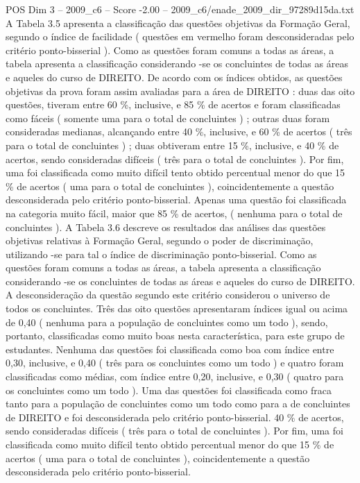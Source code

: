 \begin{textsample}{POS Dim 3 – 2009\_c6 – Score -2.00 – 2009\_c6/enade\_2009\_dir\_97289d15da.txt}
A Tabela 3.5 apresenta a classificação das questões objetivas da Formação Geral, segundo o índice de facilidade ( questões em vermelho foram desconsideradas pelo critério ponto-bisserial ).
Como as questões foram comuns a todas as áreas, a tabela apresenta a classificação considerando -se os concluintes de todas as áreas e aqueles do curso de DIREITO.
De acordo com os índices obtidos, as questões objetivas da prova foram assim avaliadas para a área de DIREITO : duas das oito questões, tiveram entre 60 \%, inclusive, e 85 \% de acertos e foram classificadas como fáceis ( somente uma para o total de concluintes ) ; outras duas foram consideradas medianas, alcançando entre 40 \%, inclusive, e 60 \% de acertos ( três para o total de concluintes ) ; duas obtiveram entre 15 \%, inclusive, e 40 \% de acertos, sendo consideradas difíceis ( três para o total de concluintes ).
Por fim, uma foi classificada como muito difícil tento obtido percentual menor do que 15 \% de acertos ( uma para o total de concluintes ), coincidentemente a questão desconsiderada pelo critério ponto-bisserial.
Apenas uma questão foi classificada na categoria muito fácil, maior que 85 \% de acertos, ( nenhuma para o total de concluintes ).
A Tabela 3.6 descreve os resultados das análises das questões objetivas relativas à Formação Geral, segundo o poder de discriminação, utilizando -se para tal o índice de discriminação ponto-bisserial.
Como as questões foram comuns a todas as áreas, a tabela apresenta a classificação considerando -se os concluintes de todas as áreas e aqueles do curso de DIREITO.
A desconsideração da questão segundo este critério considerou o universo de todos os concluintes.
Três das oito questões apresentaram índices igual ou acima de 0,40 ( nenhuma para a população de concluintes como um todo ), sendo, portanto, classificadas como muito boas nesta característica, para este grupo de estudantes.
Nenhuma das questões foi classificada como boa com índice entre 0,30, inclusive, e 0,40 ( três para os concluintes como um todo ) e quatro foram classificadas como médias, com índice entre 0,20, inclusive, e 0,30 ( quatro para os concluintes como um todo ).
Uma das questões foi classificada como fraca tanto para a população de concluintes como um todo como para a de concluintes de DIREITO e foi desconsiderada pelo critério ponto-bisserial. 40 \% de acertos, sendo consideradas difíceis ( três para o total de concluintes ).
Por fim, uma foi classificada como muito difícil tento obtido percentual menor do que 15 \% de acertos ( uma para o total de concluintes ), coincidentemente a questão desconsiderada pelo critério ponto-bisserial.

\end{textsample}
